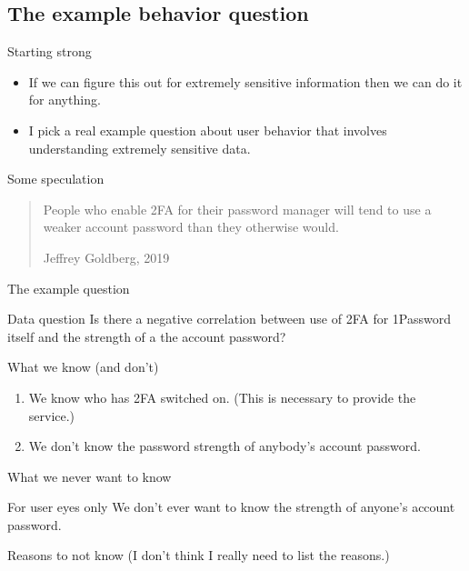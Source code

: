 \documentclass[xcolor={dvipsnames,table,hyperref}]{beamer}
\begin{document}
\subsection{The example behavior question}

\begin{frame}{Starting strong}
  \begin{itemize}
    \item If we can figure this out for extremely sensitive information then we can do it for anything.
    \item I pick a real example question about user behavior that involves understanding extremely sensitive data.
  \end{itemize}
\end{frame}

\begin{frame}{Some speculation}
  \blockquote[{Jeffrey Goldberg, 2019}]{People who enable 2FA for their password manager will tend to use a weaker account password than they otherwise would.}
\end{frame}

\begin{frame}{The example question}
  \begin{block}{Data question}
    Is there a negative correlation between use of 2FA for 1Password itself and the strength of a the account password?
  \end{block}

\end{frame}

\begin{frame}{What we know (and don't)}
  \begin{enumerate}
    \item We know who has 2FA switched on. (This is necessary to provide the service.)
    \item We don't know the password strength of anybody's account password.
  \end{enumerate}

\end{frame}

\begin{frame}{What we never want to know}
  \begin{alertblock}{For user eyes only}
    We don't ever want to know the strength of anyone's account password.
  \end{alertblock}
\end{frame}

\begin{frame}{Reasons to not know}
  (I don't think I really need to list the reasons.)
\end{frame}
\end{document}
